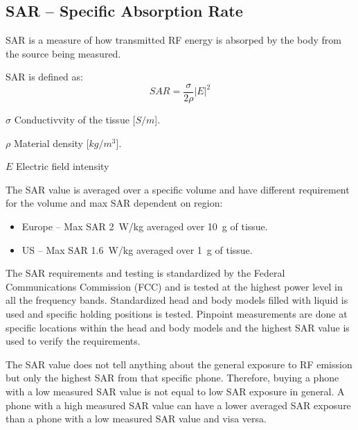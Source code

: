 \subsection{SAR -- Specific Absorption Rate}
SAR is a measure of how transmitted RF energy is absorped by the body from the source being measured.\cite{fcc2015sar} 

SAR is defined as\cite{fujimoto2008mobile}:
\begin{equation*}
  SAR = \frac{\sigma}{2\rho}|E|^2
\end{equation*}

\begin{where}
  \item [$\sigma$] Conductivvity of the tissue [$S/m$].
  \item [$\rho$] Material density [$kg/m^3$].
  \item [$E$] Electric field intensity
\end{where}

The SAR value is averaged over a specific volume and have different requirement for the volume and max SAR dependent on region:

\begin{itemize}
\item Europe -- Max SAR \SI{2}{W/kg} averaged over \SI{10}{g} of tissue.
\item US -- Max SAR \SI{1.6}{W/kg} averaged over \SI{1}{g} of tissue.
\end{itemize}

The SAR requirements and testing is standardized by the Federal Communications Commission (FCC) and is tested at the highest power level in all the frequency bands. Standardized head and body models filled with liquid is used and specific holding positions is tested. Pinpoint measurements are done at specific locations within the head and body models and the highest SAR value is used to verify the requirements.

The SAR value does not tell anything about the general exposure to RF emission but only the highest SAR from that specific phone. Therefore, buying a phone with a low measured SAR value is not equal to low SAR exposure in general. A phone with a high measured SAR value can have a lower averaged SAR exposure than a phone with a low measured SAR value and visa versa. 

